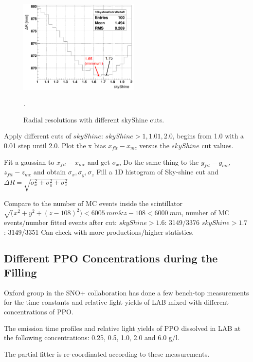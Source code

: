 \begin{figure}
	\centering
	\includegraphics[width=60mm]{skyShineCuts.png}
	\caption{ Radial resolutions with different skyShine cuts.}
	\label{skySHineCutVsFitResol}.
\end{figure}

Apply different cuts of $skyShine$: $skyShine>1, 1.01, 2.0$, begins from 1.0 with a 0.01 step until 2.0.
Plot the x bias $x_{fit}-x_{mc}$ versus the $skyShine$ cut values.

Fit	a gaussian to $x_{fit} - x_{mc}$ and get $\sigma_x$,
Do the same thing to the $y_{fit} - y_{mc}$, $z_{fit} - z_{mc}$ and	obtain	$\sigma_x, \sigma_y, \sigma_z$
Fill a 1D histogram of Sky-shine cut and
$\Delta R= \sqrt{\sigma^2_x+\sigma^2_y+\sigma^2_z}$

Compare to the number of MC events inside the scintillator $\sqrt(x^2+y^2+(z-108)^2)<6005~mm \& z-108<6000~mm$, number of MC events/number fitted events after cut:
$skyShine>1.6$: 3149/3376
$skyShine>1.7$: 3149/3351
Can check with more productions/higher statistics.

\subsection{Different PPO Concentrations during the Filling}

Oxford group in the SNO+ collaboration has done a few bench-top measurements for the time constants and relative light yields of LAB mixed with different concentrations of PPO\cite{oxfordMeasurement}.

The emission time profiles and relative light yields of PPO dissolved in LAB at the following concentrations: 0.25, 0.5, 1.0, 2.0 and 6.0 g/l.

The partial fitter is re-coordinated according to these measurements.

